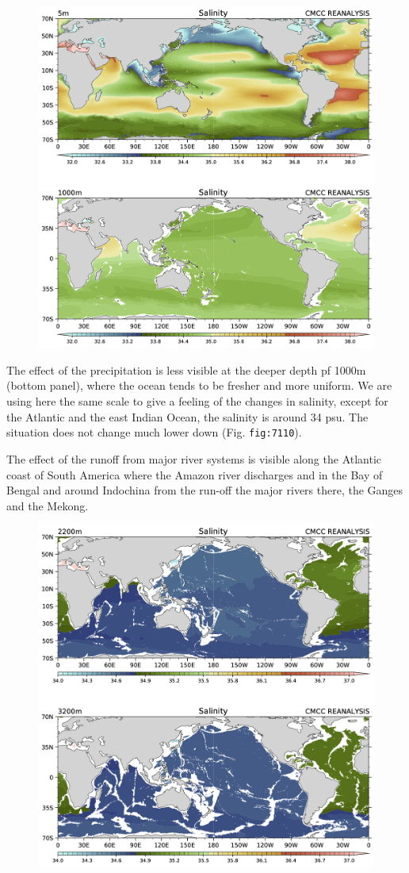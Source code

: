 \begin{figure}
	\centering
	\includegraphics[width = .7 \textwidth]{figs/GD/Sal5-1000.png}
	\caption{} \label{fig:}
\end{figure}

The effect of the precipitation is less visible at the deeper depth pf
1000m (bottom panel), where the ocean tends to be fresher and more
uniform. We are using here the same scale to give a feeling of the
changes in salinity, except for the Atlantic and the east Indian Ocean,
the salinity is around 34 psu. The situation does not change much lower
down (Fig. \texttt{fig:7110}).

The effect of the runoff from major river systems is visible along the
Atlantic coast of South America where the Amazon river discharges and in
the Bay of Bengal and around Indochina from the run-off the major rivers
there, the Ganges and the Mekong.

\begin{figure}
	\centering
	\includegraphics[width = .7 \textwidth]{figs/GD/Sal2200-3200.png}
	\caption{} \label{fig:}
\end{figure}

